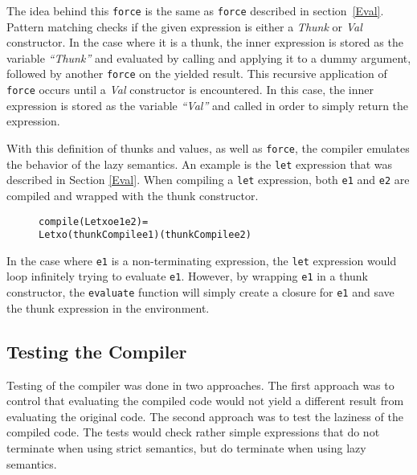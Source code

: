 \noindent The idea behind this \texttt{force} is the same as \texttt{force} described
in section~\ref{Eval}. Pattern matching checks if the given expression is either
a \textit{Thunk} or \textit{Val} constructor. In the case where it is a thunk,
the inner expression is stored as the variable \textit{``Thunk''} and evaluated
by calling and applying it to a dummy argument, followed by another
\texttt{force} on the yielded result. This recursive application of
\texttt{force} occurs until a \textit{Val} constructor is encountered. In this
case, the inner expression is stored as the variable \textit{``Val''} and called
in order to simply return the expression.

With this definition of thunks and values, as well as \texttt{force}, the
compiler emulates the behavior of the lazy semantics. An example is the
\texttt{let} expression that was described in Section \ref{Eval}.
When compiling a \texttt{let} expression, both \texttt{e1} and \texttt{e2} are
compiled and wrapped with the thunk constructor.

\begin{figure}[!ht]
\begin{alltt}
compile (Let xo e1 e2) =
  Let xo (thunkCompile e1) (thunkCompile e2)
\end{alltt}
\end{figure}

\noindent In the case where \texttt{e1} is a non-terminating expression,
the \texttt{let} expression would loop infinitely trying to evaluate
\texttt{e1}. However, by wrapping \texttt{e1} in a thunk constructor, the
\texttt{evaluate} function will simply create a closure for \texttt{e1} and save
the thunk expression in the environment.

\subsection{Testing the Compiler}

Testing of the compiler was done in two approaches. The first approach was to
control that evaluating the compiled code would not yield a different result
from evaluating the original code. The second approach was to test the laziness
of the compiled code. The tests would check rather simple expressions that do
not terminate when using strict semantics, but do terminate when using lazy
semantics.


